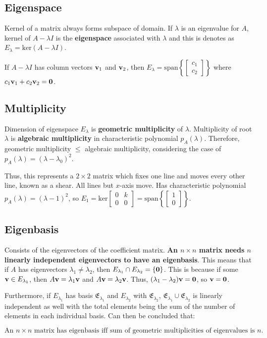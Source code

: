\subsection{Eigenspace}

Kernel of a matrix always forms subspace of domain. If $\lambda$ is an eigenvalue for $A$,
kernel of $A-\lambda I$ is the \textbf{eigenspace} associated with $\lambda$ and 
this is denotes as $E_\lambda=\mathrm{ker}(A-\lambda I)$.

If $A-\lambda I$ has column vectors $\textbf{v}_1$ and $\textbf{v}_2$, then 
$E_\lambda=\mathrm{span}\left\{\begin{bmatrix}c_1\\c_2\end{bmatrix}\right\}$ where $c_1\textbf{v}_1+c_2\textbf{v}_2=\textbf{0}$.

\subsection{Multiplicity}

Dimension of eigenspace $E_\lambda$ is \textbf{geometric multiplicity} of $\lambda$.
Multiplicity of root $\lambda$ is \textbf{algebraic multiplicity} in characteristic polynomial $p_A(\lambda)$.
Therefore, geometric multiplicity $\leq$ algebraic multiplicity, considering the case of $p_A(\lambda)=(\lambda-\lambda_0)^2$.

Thus, this represents a $2\times 2$ matrix which fixes one line and moves every other line, known as a shear. All lines but $x$-axis move.
Has characteristic polynomial $p_A(\lambda)=(\lambda-1)^2$, so $E_1=\mathrm{ker}\begin{bmatrix}0&k\\0&0\end{bmatrix}=\mathrm{span}\left\{\begin{bmatrix}1\\0\end{bmatrix}\right\}$.

\subsection{Eigenbasis}

Consists of the eigenvectors of the coefficient matrix. \textbf{An $n\times n$ matrix needs $n$ linearly independent
eigenvectors to have an eigenbasis}. This means that if $A$ has eigenvectors $\lambda_1\neq\lambda_2$, then $E_{\lambda_1}\cap E_{\lambda_2}=\left\{\textbf{0}\right\}$.
This is because if some $\textbf{v}\in E_{\lambda_1}$, then $A\textbf{v}=\lambda_1\textbf{v}$ and $A\textbf{v}=\lambda_2\textbf{v}$.
Thus, $(\lambda_1-\lambda_2)\textbf{v}=\textbf{0}$, so $\textbf{v}=\textbf{0}$.

\noindent
Furthermore, if $E_{\lambda_1}$ has basis $\mathfrak{E}_{\lambda_1}$ and $E_{\lambda_2}$ with $\mathfrak{E}_{\lambda_2}$, $\mathfrak{E}_{\lambda_1}\cup \mathfrak{E}_{\lambda_2}$ is linearly independent as well 
with the total elements being the sum of the number of elements in each individual basis.
Can then be concluded that:

$$
\boxed{\text{An $n\times n$ matrix has eigenbasis iff sum of geometric multiplicities of eigenvalues is $n$.}}
$$